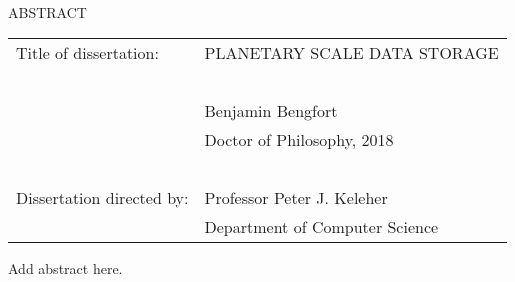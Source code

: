 
\hbox{\ }

\renewcommand{\baselinestretch}{1}
\small \normalsize

\begin{center}
\large{{ABSTRACT}}

\vspace{3em}

\end{center}
\hspace{-.15in}
\begin{tabular}{ll}
Title of dissertation:    & {\large  PLANETARY SCALE DATA STORAGE }\\
\ \\
&                          {\large  Benjamin Bengfort} \\
&                           {\large Doctor of Philosophy, 2018} \\
\ \\
Dissertation directed by: & {\large  Professor Peter J. Keleher} \\
&               {\large  Department of Computer Science } \\
\end{tabular}

\vspace{3em}

\renewcommand{\baselinestretch}{2}
\large \normalsize

Add abstract here.
